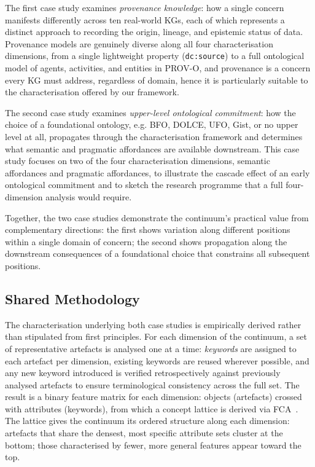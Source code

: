 \documentclass[runningheads]{llncs}
\newcommand{\add}[1]{\textcolor{addedcolor}{#1}}
\begin{document}
\add{
The first case study examines \emph{provenance knowledge}: how a
single concern manifests differently across ten real-world KGs, each of which represents a distinct approach to recording the origin, lineage, and epistemic status of data. Provenance models are genuinely diverse along all
four characterisation dimensions, from a single lightweight property (\texttt{dc:source}) to a full ontological model of agents, activities, and entities in PROV-O, and provenance is a concern every KG
must address, regardless of domain, hence it is particularly suitable to the characterisation offered by our framework.}
 
\add{The second case study examines \emph{upper-level ontological
commitment}: how the choice of a foundational ontology, e.g. BFO, DOLCE, UFO, Gist, or no upper level at all,  propagates through the characterisation framework and determines what semantic and pragmatic affordances are
available downstream. This case study focuses on two of the four
characterisation dimensions, semantic affordances and pragmatic
affordances, to illustrate the cascade effect of an early ontological commitment and to sketch the research programme that a full four-dimension analysis would require.
}

\add{ 
Together, the two case studies demonstrate the continuum's practical value from complementary directions: the first shows variation along different positions within a single domain of concern; the second shows propagation along the downstream consequences of a foundational choice that constrains all subsequent positions.}

\subsection{Shared Methodology}\label{ssec:methodology}
\add{
The characterisation underlying both case studies is empirically derived rather than stipulated from first principles. For each dimension of the
continuum, a set of representative artefacts is analysed one at a time: \emph{keywords} are assigned to each artefact per dimension, existing keywords are reused wherever possible, and any new keyword introduced is verified retrospectively against previously analysed artefacts to ensure terminological consistency across the full set. The result is a binary
feature matrix for each dimension: objects (artefacts) crossed with attributes (keywords), from which a concept lattice is derived via FCA~\cite{ganter1999formal}. The lattice gives the continuum its ordered structure along each dimension: artefacts that share the densest, most specific attribute sets cluster at the bottom; those characterised by fewer, more general features appear toward the top.}
\end{document}
